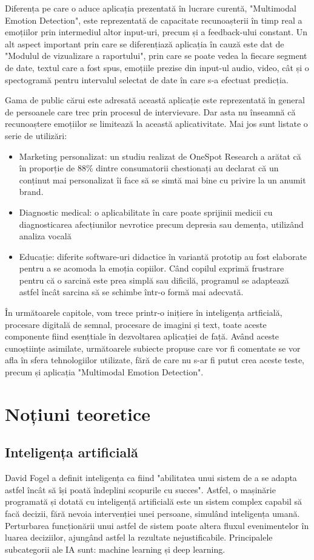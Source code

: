 \documentclass[a4paper, 12pt]{report}
\begin{document}
	Diferența pe care o aduce aplicația prezentată în lucrare curentă, "Multimodal Emotion Detection",  este reprezentată de capacitate recunoașterii în timp real a emoțiilor prin intermediul altor input-uri, precum și a feedback-ului constant. Un alt aspect important prin care se diferențiază aplicația în cauză este dat de "Modulul de vizualizare a raportului", prin care se poate vedea la fiecare segment de date, textul care a fost spus, emoțiile prezise din input-ul audio, video, cât și o spectogramă pentru intervalul selectat de date în care s-a efectuat predicția.
	
	Gama de public cărui este adresată această aplicație este reprezentată în general de persoanele care trec prin procesul de intervievare. Dar asta nu înseamnă că recunoaștere emoțiilor se limitează la această aplicativitate. Mai jos sunt listate o serie de utilizări:
	\begin{itemize}
		\item Marketing personalizat: un studiu realizat de OneSpot Research a arătat că în proporție de 88\% dintre consumatorii chestionați au declarat că un conținut mai personalizat îi face să se simtă mai bine cu privire la un anumit brand.
		\item Diagnostic medical: o aplicabilitate în care poate sprijinii medicii cu diagnosticarea afecțiunilor nevrotice precum depresia sau demența, utilizând analiza vocală
		\item Educație: diferite software-uri didactice în variantă prototip au fost elaborate pentru a se acomoda la emoția copiilor. Când copilul exprimă frustrare pentru că o sarcină este prea simplă sau dificilă, programul se adaptează astfel încât sarcina să se schimbe într-o formă mai adecvată.
	\end{itemize}
	
	În următoarele capitole, vom trece printr-o inițiere în inteligența artficială, procesare digitală de semnal, procesare de imagini și text, toate aceste componente fiind esențtiale în dezvoltarea aplicației de față. Având aceste cunoștiințe asimilate, următoarele subiecte propuse care vor fi comentate se vor afla în sfera tehnologiilor utilizate, fără de care nu s-ar fi putut crea aceste teste, precum și aplicația "Multimodal Emotion Detection". 
	\clearpage
	
	\section{Noțiuni teoretice}
	\subsection{Inteligența artificială}
	David Fogel a definit inteligența ca fiind "abilitatea unui sistem de a se adapta astfel încât să își poată îndeplini scopurile cu succes". Astfel, o mașinărie programată și dotată cu inteligență artificială este un sistem complex capabil să facă decizii, fără nevoia intervenției unei persoane, simulând inteligența umană. Perturbarea funcționării unui astfel de sistem poate altera fluxul evenimentelor în luarea deciziilor, ajungând astfel la rezultate nejustificabile. Principalele subcategorii ale IA sunt: machine learning și deep learning.
		
\end{document}

